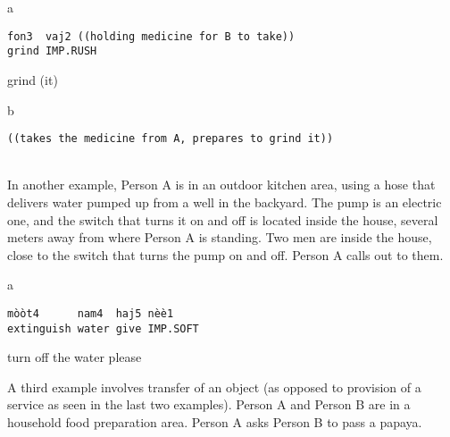 \documentclass[output=paper]{langsci/langscibook}
\begin{document}
\vspace{-1mm}
%
\begin{mdframednoverticalspace}[style=firstfoc]
\begin{transbox}{1}{a}
\begin{verbatim}
fon3  vaj2 ((holding medicine for B to take))
grind IMP.RUSH
\end{verbatim}
grind (it)
\end{transbox}
\end{mdframednoverticalspace}
%
\begin{mdframednoverticalspace}[style=secondfoc]
\begin{transbox}{2}{b}
\begin{verbatim}
((takes the medicine from A, prepares to grind it))
\end{verbatim}
\end{transbox}
\end{mdframednoverticalspace}\\

In another example, Person A is in an outdoor kitchen area, using a hose that delivers water pumped up from a well in the backyard. The pump is an electric one, and the switch that turns it on and off is located inside the house, several meters away from where Person A is standing. Two men are inside the house, close to the switch that turns the pump on and off. Person A calls out to them.

\vspace{-1mm}
%
\begin{mdframednoverticalspace}[style=firstfoc]
\begin{transbox}{1}{a}
\begin{verbatim}
mòòt4      nam4  haj5 nèè1
extinguish water give IMP.SOFT
\end{verbatim}
turn off the water please
\end{transbox}
\end{mdframednoverticalspace}
%
\begin{mdframednoverticalspace}[style=secondfoc]
\end{mdframednoverticalspace}\bigskip

A third example involves transfer of an object (as opposed to provision of a service as seen in the last two examples). Person A and Person B are in a household food preparation area. Person A asks Person B to pass a papaya.
\end{document}
